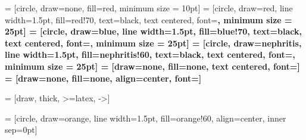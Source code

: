 
 = [circle, draw=none, fill=red, minimum size = 10pt]
 = [circle, draw=red, line width=1.5pt, fill=red!70, text=black, text centered, font=\bf \normalsize, minimum size = 25pt]
 = [circle, draw=blue, line width=1.5pt, fill=blue!70, text=black, text centered, font=\bf \normalsize, minimum size = 25pt]
 = [circle, draw=nephritis, line width=1.5pt, fill=nephritis!60, text=black, text centered, font=\bf \normalsize, minimum size = 25pt]
 = [draw=none, fill=none, text centered, font=\bf \normalsize]
 = [draw=none, fill=none, align=center, font=\bf \normalsize]

  = [draw, thick, >=latex, ->]

 = [circle, draw=orange, line width=1.5pt, fill=orange!60, align=center, inner sep=0pt]


